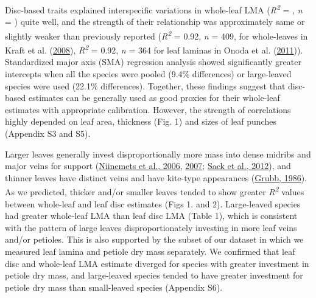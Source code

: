 \documentclass[
  12pt,
  a4paper,
,tablecaptionabove
]{scrartcl}
\begin{document}
Disc-based traits explained interspecific variations in whole-leaf LMA (\emph{R\textsuperscript{2}} = , \emph{n} = ) quite well, and the strength of their relationship was approximately same or slightly weaker than previously reported (\emph{R\textsuperscript{2}} = 0.92, \emph{n} = 409, for whole-leaves in Kraft et al. (\protect\hyperlink{ref-Kraft2008}{2008}), \emph{R\textsuperscript{2}} = 0.92, \emph{n} = 364 for leaf laminas in Onoda et al. (\protect\hyperlink{ref-Onoda2011}{2011})).
Standardized major axis (SMA) regression analysis showed significantly greater intercepts when all the species were pooled (9.4\% differences) or large-leaved species were used (22.1\% differences).
Together, these findings suggest that disc-based estimates can be generally used as good proxies for their whole-leaf estimates with appropriate calibration.
However, the strength of correlations highly depended on leaf area, thickness (Fig. 1) and sizes of leaf punches (Appendix S3 and S5).

Larger leaves generally invest disproportionally more mass into dense midribs and major veins for support (\protect\hyperlink{ref-Niinemets2006}{Niinemets et al., 2006}, \protect\hyperlink{ref-Niinemets2007}{2007}; \protect\hyperlink{ref-Sack2012}{Sack et al., 2012}), and thinner leaves have distinct veins and have kite-type appearances (\protect\hyperlink{ref-Grubb1986}{Grubb, 1986}).
As we predicted, thicker and/or smaller leaves tended to show greater \emph{R\textsuperscript{2}} values between whole-leaf and leaf disc estimates (Figs 1. and 2).
Large-leaved species had greater whole-leaf LMA than leaf disc LMA (Table 1), which is consistent with the pattern of large leaves disproportionately investing in more leaf veins and/or petioles.
This is also supported by the subset of our dataset in which we measured leaf lamina and petiole dry mass separately.
We confirmed that leaf disc and whole-leaf LMA estimate diverged for species with greater investment in petiole dry mass, and large-leaved species tended to have greater investment for petiole dry mass than small-leaved species (Appendix S6).
\end{document}
